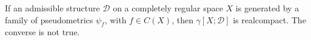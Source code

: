 If an admissible structure $\mathcal{D}$ on a completely regular space $X$ is generated by a family of pseudometrics $\psi_f$, with $f \in C(X)$, then $\gamma[X; \mathcal{D}]$ is realcompact. The converse is not true.
